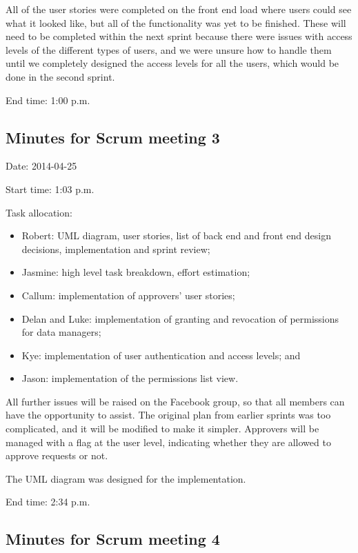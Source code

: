 \documentclass[a4paper,titlepage,12pt]{article}
\begin{document}
All of the user stories were completed on the front end load where users could
see what it looked like, but all of the functionality was yet to be finished.
These will need to be completed within the next sprint because there were
issues with access levels of the different types of users, and we were unsure
how to handle them until we completely designed the access levels for all the
users, which would be done in the second sprint.

End time: 1:00 p.m.

\subsection{Minutes for Scrum meeting 3}

Date: 2014-04-25

Start time: 1:03 p.m.

Task allocation:

\begin{itemize}
	\item Robert: UML diagram, user stories, list of back end and front end
	      design decisions, implementation and sprint review;
	\item Jasmine: high level task breakdown, effort estimation;
	\item Callum: implementation of approvers' user stories;
	\item Delan and Luke: implementation of granting and revocation of
	      permissions for data managers;
	\item Kye: implementation of user authentication and access levels; and
	\item Jason: implementation of the permissions list view.
\end{itemize}

All further issues will be raised on the Facebook group, so that all members
can have the opportunity to assist. The original plan from earlier sprints was
too complicated, and it will be modified to make it simpler. Approvers will be
managed with a flag at the user level, indicating whether they are allowed to
approve requests or not.

The UML diagram was designed for the implementation.

End time: 2:34 p.m.

\subsection{Minutes for Scrum meeting 4}
\end{document}
